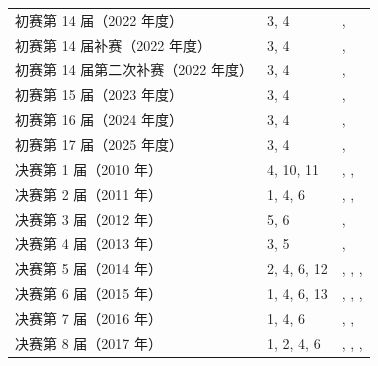 \documentclass[UTF8,12pt,a4paper,fontset=fandol]{ctexart}
\begin{document}
\begin{longtable}{p{}p{}p{}}
初赛第 14 届（2022 年度） & 3, 4 & \pageref{ex:ch04-14th-A:3}, \pageref{ex:ch04-14th-A:4}\\

初赛第 14 届补赛（2022 年度） & 3, 4 & \pageref{ex:ch05-14th-A-makeup:3}, \pageref{ex:ch05-14th-A-makeup:4}\\

初赛第 14 届第二次补赛（2022 年度） & 3, 4 & \pageref{ex:ch06-14th-A-makeup2:3}, \pageref{ex:ch06-14th-A-makeup2:4}\\

初赛第 15 届（2023 年度） & 3, 4 & \pageref{ex:ch03-15th-A:3}, \pageref{ex:ch03-15th-A:4}\\

初赛第 16 届（2024 年度） & 3, 4 & \pageref{ex:ch02-16th-A:3}, \pageref{ex:ch02-16th-A:4}\\

初赛第 17 届（2025 年度） & 3, 4 & \pageref{ex:ch01-17th-A:3}, \pageref{ex:ch01-17th-A:4}\\

决赛第 1 届（2010 年） & 4, 10, 11 & \pageref{ex:fin01-all:4}, \pageref{ex:fin01-all:10}, \pageref{ex:fin01-all:11}\\

决赛第 2 届（2011 年） & 1, 4, 6 & \pageref{ex:fin02-all:1}, \pageref{ex:fin02-all:4}, \pageref{ex:fin02-all:6}\\

决赛第 3 届（2012 年） & 5, 6 & \pageref{ex:fin03-all:5}, \pageref{ex:fin03-all:6}\\

决赛第 4 届（2013 年） & 3, 5 & \pageref{ex:fin04-all:3}, \pageref{ex:fin04-all:5}\\

决赛第 5 届（2014 年） & 2, 4, 6, 12 & \pageref{ex:fin05-hi:2}, \pageref{ex:fin05-hi:4}, \pageref{ex:fin05-lo:3}, \pageref{ex:fin05-hi:11}\\

决赛第 6 届（2015 年） & 1, 4, 6, 13 & \pageref{ex:fin06-lo:1}, \pageref{ex:fin06-lo:4}, \pageref{ex:fin06-lo:6}, \pageref{ex:fin06-hi:12}\\

决赛第 7 届（2016 年） & 1, 4, 6 & \pageref{ex:fin07-hi:1}, \pageref{ex:fin07-hi:4}, \pageref{ex:fin07-hi:6}\\

决赛第 8 届（2017 年） & 1, 2, 4, 6 & \pageref{ex:fin08-hi:1}, \pageref{ex:fin08-hi:2}, \pageref{ex:fin08-hi:4}, \pageref{ex:fin08-hi:6}\\


\end{longtable}
\end{document}
